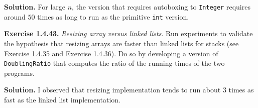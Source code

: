 \documentclass[12pt, a4paper]{article}
\newenvironment{ex}[2][Exercise]
{\par\medskip\noindent \textbf{#1 #2.}}
{\medskip}
\newenvironment{sol}[1][Solution]
{\par\medskip\noindent \textbf{#1.} }
{\medskip}
\begin{document}
	\begin{sol}
		For large $n$, the version that requires autoboxing to \texttt{Integer} requires around $50$
		times as long to run as the primitive \texttt{int} version.
	\end{sol}
	\begin{ex}{1.4.43}
		\emph{Resizing array versus linked lists}. Run experiments to validate the hypothesis
		that resizing arrays are faster than linked lists for stacks (see Exercise 1.4.35
		and Exercise 1.4.36). Do so by developing a version of \texttt{DoublingRatio}
		that computes the ratio of the running times of the two programs.
	\end{ex}
	\begin{sol}
		I observed that resizing implementation tends to run about 3 times as fast as the linked list
		implementation.
	\end{sol}
	\pagebreak
	\printbibliography
\end{document}
